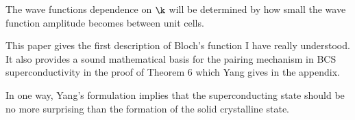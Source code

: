 The wave functions dependence on $\k$ will be determined by how small 
the wave function amplitude becomes between unit cells.

This paper gives the first description of Bloch's function I have really understood. 
It also provides a sound mathematical basis for the pairing mechanism in BCS
superconductivity in the proof of Theorem 6 which Yang gives in the appendix.

In one way, Yang's formulation implies that the superconducting state
should be no more surprising than the formation of the solid crystalline state.


